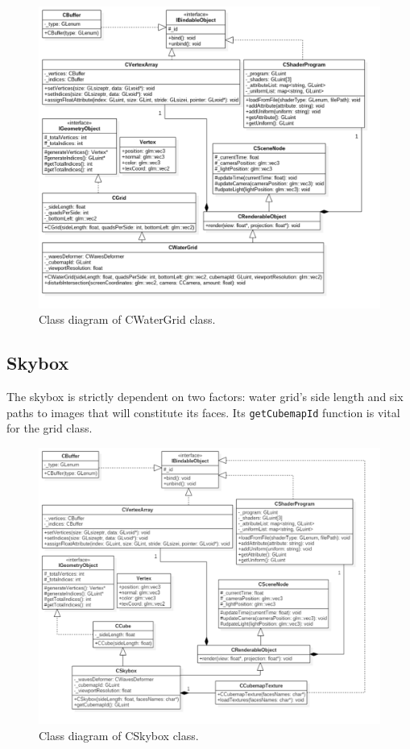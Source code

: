 \documentclass{report}
\begin{document}
\begin{figure}[H]
    \centering
    \includegraphics[width=1.0\textwidth]{images/water_grid_uml.pdf}
    \caption{Class diagram of CWaterGrid class.}
    \label{fig:water_grid_uml}
\end{figure}

\newpage
\subsection{Skybox}
The skybox is strictly dependent on two factors: water grid's side length and six paths to images that will constitute its faces. Its \texttt{getCubemapId} function is vital for the grid class. 
\begin{figure}[H]
    \centering
    \includegraphics[width=1.0\textwidth]{images/skybox_uml.pdf}
    \caption{Class diagram of CSkybox class.}
    \label{fig:skybox_uml}
\end{figure}
\end{document}
